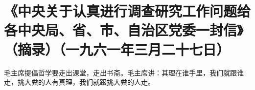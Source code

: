 \section{《中央关于认真进行调查研究工作问题给各中央局、省、市、自治区党委一封信》（摘录）（一九六一年三月二十七日）}


毛主席提倡哲学要走出课堂，走出书斋。毛主席讲：其理在谁手里，我们就跟谁走，挑大粪的人有真理，我们就跟挑大粪的人走。


